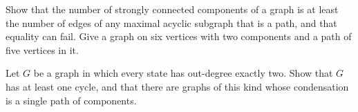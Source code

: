 \begin{exercise}
Show that the number of strongly connected components of a graph is at least the number of edges of any maximal acyclic subgraph that is a path, and that equality can fail. Give a graph on six vertices with two components and a path of five vertices in it.
\end{exercise}

\begin{exercise}
Let $G$ be a graph in which every state has out-degree exactly two. Show that $G$ has at least one cycle, and that there are graphs of this kind whose condensation is a single path of components.
\end{exercise}

